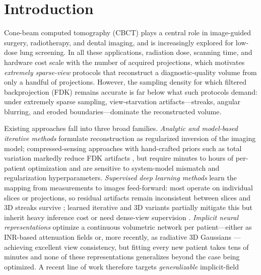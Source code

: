 
\newcommand{\method}{DIF-Gaussian++}

\section{Introduction}
\label{sec:intro}

Cone-beam computed tomography (CBCT) plays a central role in image-guided
surgery, radiotherapy, and dental imaging, and is increasingly explored for
low-dose lung screening. In all these applications, radiation dose, scanning
time, and hardware cost scale with the number of acquired projections, which
motivates \emph{extremely sparse-view} protocols that reconstruct a
diagnostic-quality volume from only a handful of projections. However, the
sampling density for which filtered backprojection (FDK)
\cite{feldkamp1984practical} remains accurate is far below what such protocols
demand: under extremely sparse sampling, view-starvation artifacts---streaks,
angular blurring, and eroded boundaries---dominate the reconstructed volume.

Existing approaches fall into three broad families. \emph{Analytic and
model-based iterative methods} formulate reconstruction as regularized
inversion of the imaging model; compressed-sensing approaches with
hand-crafted priors such as total variation markedly reduce FDK artifacts
\cite{sidky2008image}, but require minutes to hours of per-patient
optimization and are sensitive to system-model mismatch and regularization
hyperparameters. \emph{Supervised deep learning methods} learn the mapping
from measurements to images feed-forward: most operate on individual slices
or projections, so residual artifacts remain inconsistent between slices and
3D streaks survive \cite{jin2017deep,kang2017deep}; learned iterative and 3D
variants partially mitigate this but inherit heavy inference cost or need
dense-view supervision \cite{adler2018learned}. \emph{Implicit neural
representations} optimize a continuous volumetric network per patient---either
as INR-based attenuation fields \cite{zang2021naf,cai2023neat,cai2024semiinr}
or, more recently, as radiative 3D Gaussians
\cite{zhang2024r2gaussian,cai2024xgaussian}---achieving excellent view
consistency, but fitting every new patient takes tens of minutes and none of
these representations generalizes beyond the case being optimized. A recent
line of work therefore targets \emph{generalizable} implicit-field

